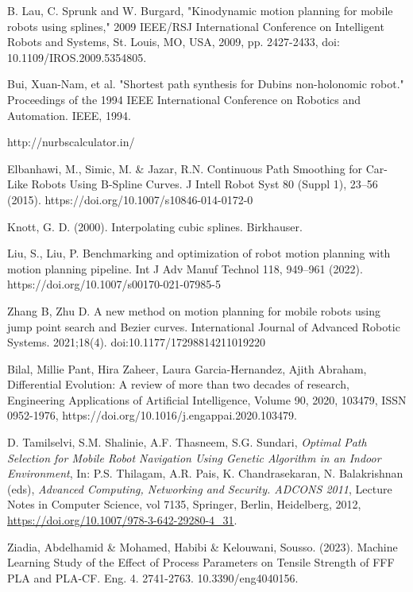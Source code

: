 \begin{thebibliography}{9}
B. Lau, C. Sprunk and W. Burgard, "Kinodynamic motion planning for mobile robots using splines," 
2009 IEEE/RSJ International Conference on Intelligent Robots and Systems, St. Louis, MO, USA, 2009, 
pp. 2427-2433, doi: 10.1109/IROS.2009.5354805. 

Bui, Xuan-Nam, et al. "Shortest path synthesis for Dubins non-holonomic robot." Proceedings of the 1994 
IEEE International Conference on Robotics and Automation. IEEE, 1994.

http://nurbscalculator.in/

Elbanhawi, M., Simic, M. \& Jazar, R.N. Continuous Path Smoothing for Car-Like Robots Using B-Spline 
Curves. J Intell Robot Syst 80 (Suppl 1), 23–56 (2015). https://doi.org/10.1007/s10846-014-0172-0

Knott, G. D. (2000). Interpolating cubic splines. Birkhauser. 

Liu, S., Liu, P. Benchmarking and optimization of robot motion planning with motion planning 
pipeline. Int J Adv Manuf Technol 118, 949–961 (2022). https://doi.org/10.1007/s00170-021-07985-5


Zhang B, Zhu D. A new method on motion planning for mobile robots using jump point search and 
Bezier curves. International Journal of Advanced Robotic Systems. 2021;18(4). doi:10.1177/17298814211019220

Bilal, Millie Pant, Hira Zaheer, Laura Garcia-Hernandez, Ajith Abraham,
Differential Evolution: A review of more than two decades of research,
Engineering Applications of Artificial Intelligence,
Volume 90,
2020,
103479,
ISSN 0952-1976,
https://doi.org/10.1016/j.engappai.2020.103479.

D. Tamilselvi, S.M. Shalinie, A.F. Thasneem, S.G. Sundari,
\emph{Optimal Path Selection for Mobile Robot Navigation Using Genetic Algorithm in an Indoor Environment},
In: P.S. Thilagam, A.R. Pais, K. Chandrasekaran, N. Balakrishnan (eds),
\emph{Advanced Computing, Networking and Security. ADCONS 2011},
Lecture Notes in Computer Science, vol 7135,
Springer, Berlin, Heidelberg, 2012,
\url{https://doi.org/10.1007/978-3-642-29280-4_31}.

Ziadia, Abdelhamid \& Mohamed, Habibi \& Kelouwani, Sousso. (2023). Machine Learning Study of the Effect of 
Process Parameters on Tensile Strength of FFF PLA and PLA-CF. Eng. 4. 2741-2763. 10.3390/eng4040156. 


\end{thebibliography}

